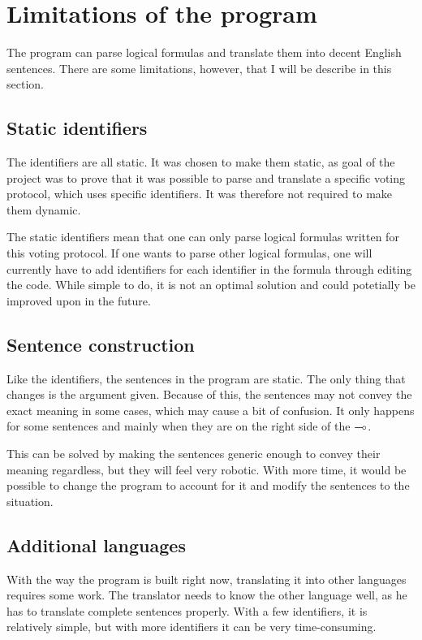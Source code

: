 \section{Limitations of the program}
\label{04_04}

The program can parse logical formulas and translate them into decent English sentences. There are some limitations, however, that I will be describe in this section.

\subsection{Static identifiers}
\label{04_04_01}

The identifiers are all static. It was chosen to make them static, as goal of the project was to prove that it was possible to parse and translate a specific voting protocol, which uses specific identifiers. It was therefore not required to make them dynamic.

The static identifiers mean that one can only parse logical formulas written for this voting protocol. If one wants to parse other logical formulas, one will currently have to add identifiers for each identifier in the formula through editing the code. While simple to do, it is not an optimal solution and could potetially be improved upon in the future.

\subsection{Sentence construction}
\label{04_04_02}

Like the identifiers, the sentences in the program are static. The only thing that changes is the argument given. Because of this, the sentences may not convey the exact meaning in some cases, which may cause a bit of confusion. It only happens for some sentences and mainly when they are on the right side of the $\multimap$.

This can be solved by making the sentences generic enough to convey their meaning regardless, but they will feel very robotic. With more time, it would be possible to change the program to account for it and modify the sentences to the situation.

\subsection{Additional languages}
\label{04_04_03}

With the way the program is built right now, translating it into other languages requires some work. The translator needs to know the other language well, as he has to translate complete sentences properly. With a few identifiers, it is relatively simple, but with more identifiers it can be very time-consuming.

